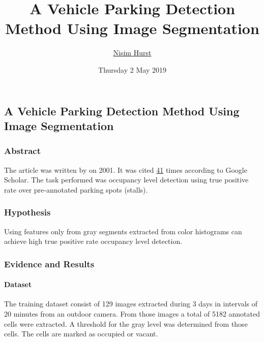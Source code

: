 \documentclass[]{article}
\title{A Vehicle Parking Detection Method Using Image Segmentation}
\author{\href{mailto:langheran@gmail.com}{Nisim Hurst}}
\date{Thursday 2 May 2019}
\let\oldparagraph\paragraph
\renewcommand{\paragraph}[1]{\oldparagraph{#1}\mbox{}}
\begin{document}
\maketitle

\label{toc}

\hypertarget{a-vehicle-parking-detection-method-using-image-segmentation}{%
\subsection{A Vehicle Parking Detection Method Using Image Segmentation}\label{a-vehicle-parking-detection-method-using-image-segmentation}}

\hypertarget{abstract}{%
\subsubsection{Abstract}\label{abstract}}

The article was written by \autocite{Yamada_2001} on 2001. It was cited \href{https://scholar.google.com/scholar?cluster=46549803554427231\&hl=en\&as_sdt=2005\&sciodt=0,5}{41} times according to Google Scholar. The task performed was occupancy level detection using true positive rate over pre-annotated parking spots (stalls).

\hypertarget{hypothesis}{%
\subsubsection{Hypothesis}\label{hypothesis}}

Using features only from gray segments extracted from color histograms can achieve high true positive rate occupancy level detection.

\hypertarget{evidence-and-results}{%
\subsubsection{Evidence and Results}\label{evidence-and-results}}

\hypertarget{dataset}{%
\paragraph{Dataset}\label{dataset}}

The training dataset consist of 129 images extracted during 3 days in intervals of 20 minutes from an outdoor camera. From those images a total of 5182 annotated cells were extracted. A threshold for the gray level was determined from those cells. The cells are marked as occupied or vacant.
\end{document}

